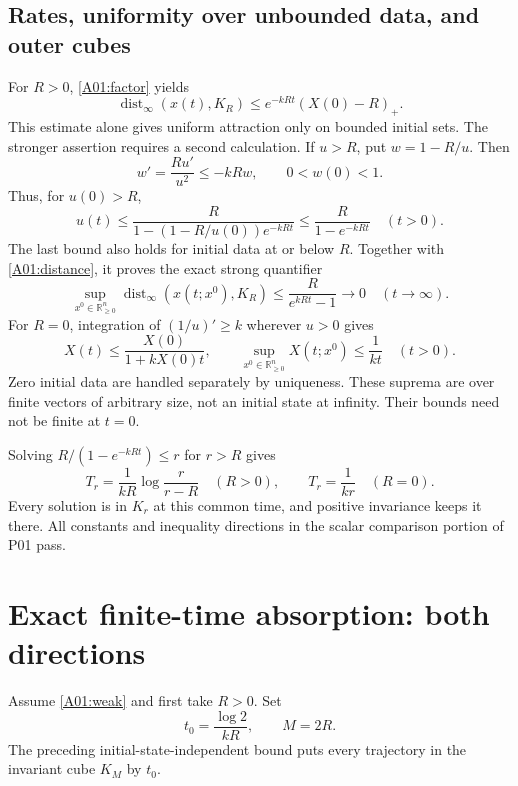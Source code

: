 \documentclass[11pt]{article}
\newcommand{\RR}{\mathbb R}
\newcommand{\Orth}{\RR_{\geq0}^{n}}
\newcommand{\dist}{\operatorname{dist}_{\infty}}
\newcommand{\pos}[1]{(#1)_+}
\begin{document}
\subsection{Rates, uniformity over unbounded data, and outer cubes}
For $R>0$, \eqref{A01:factor} yields
\begin{equation}\label{A01:rate}
 \dist(x(t),K_R)\leq e^{-kRt}\pos{X(0)-R}.
\end{equation}
This estimate alone gives uniform attraction only on bounded initial
sets. The stronger assertion requires a second calculation. If $u>R$,
put $w=1-R/u$. Then
\[
 w'=\frac{Ru'}{u^2}\leq-kR w,
 \qquad 0<w(0)<1.
\]
Thus, for $u(0)>R$,
\[
 u(t)\leq\frac{R}{1-(1-R/u(0))e^{-kRt}}
          \leq\frac{R}{1-e^{-kRt}}\quad(t>0).
\]
The last bound also holds for initial data at or below $R$. Together
with \eqref{A01:distance}, it proves the exact strong quantifier
\begin{equation}\label{A01:uniform}
 \sup_{x^0\in\Orth}\dist(x(t;x^0),K_R)
 \leq\frac{R}{e^{kRt}-1}\longrightarrow0\quad(t\to\infty).
\end{equation}
For $R=0$, integration of $(1/u)'\geq k$ wherever $u>0$ gives
\begin{equation}\label{A01:zero}
 X(t)\leq\frac{X(0)}{1+kX(0)t},\qquad
 \sup_{x^0\in\Orth}X(t;x^0)\leq\frac1{kt}\quad(t>0).
\end{equation}
Zero initial data are handled separately by uniqueness. These suprema
are over finite vectors of arbitrary size, not an initial state at
infinity. Their bounds need not be finite at $t=0$.

Solving $R/(1-e^{-kRt})\leq r$ for $r>R$ gives
\[
 T_r=\frac1{kR}\log\frac{r}{r-R}\quad(R>0),\qquad
 T_r=\frac1{kr}\quad(R=0).
\]
Every solution is in $K_r$ at this common time, and positive invariance
keeps it there. All constants and inequality directions in the scalar
comparison portion of P01 pass.

\section{Exact finite-time absorption: both directions}
Assume \eqref{A01:weak} and first take $R>0$. Set
\[
 t_0=\frac{\log2}{kR},\qquad M=2R.
\]
The preceding initial-state-independent bound puts every trajectory
in the invariant cube $K_M$ by $t_0$.
\end{document}
